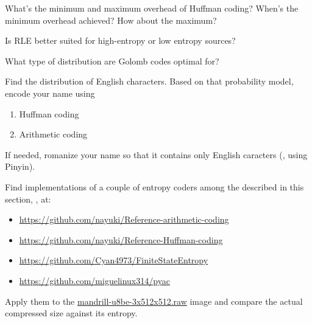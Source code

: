 \begin{exercise}
What's the minimum and maximum overhead of Huffman coding?
When's the minimum overhead achieved? How about the maximum?
\end{exercise}

\begin{exercise}
Is RLE better suited for high-entropy or low entropy sources?
\end{exercise}

\begin{exercise}
What type of distribution are Golomb codes optimal for?
\end{exercise}

\begin{exercise}
Find the distribution of English characters. Based on that probability model,
encode your name using
\begin{enumerate}
    \item Huffman coding
    \item Arithmetic coding
\end{enumerate}
If needed, romanize your name so that it contains only English caracters (\eg, using Pinyin).
\end{exercise}

\begin{exercise}
Find implementations of a couple of entropy coders among the described in this section, \eg, at:
\begin{itemize}
\item \url{https://github.com/nayuki/Reference-arithmetic-coding}
\item \url{https://github.com/nayuki/Reference-Huffman-coding}
\item \url{https://github.com/Cyan4973/FiniteStateEntropy}
\item \url{https://github.com/miguelinux314/pyac}
\end{itemize}

Apply them to the \url{mandrill-u8be-3x512x512.raw} image and compare the actual compressed
size against its entropy.
\end{exercise}

